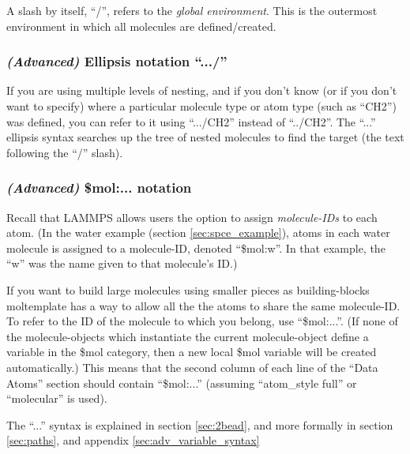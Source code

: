 \documentclass[11pt]{article}
\begin{document}
A slash by itself, ``/'', refers to the \textit{global environment}.
This is the outermost environment in which all molecules are defined/created.


\subsubsection{\textit{(Advanced)} Ellipsis notation ``.../''}
\label{sec:ellipsis_type}
If you are using multiple levels of nesting,
and if you don't know (or if you don't want to specify) where
a particular molecule type or atom type (such as ``CH2'') was defined, 
you can refer to it using ``.../CH2'' 
instead of ``../CH2''.
The ``...'' ellipsis syntax searches up the tree of nested 
molecules to find the target (the text following the ``/'' slash).

\subsubsection{\textit{(Advanced)} \$mol:... notation}
\label{sec:ellipsis_mol}
Recall that LAMMPS allows users the option to assign
\textit{molecule-IDs} to each atom.
(In the water example (section \ref{sec:spce_example}), atoms in
each water molecule is assigned to a molecule-ID, denoted ``\$mol:w''.
In that example, the ``w'' was the name given to that molecule's ID.)

If you want to build large molecules using smaller pieces as building-blocks
moltemplate has a way to allow all the the atoms to share the same molecule-ID.
To refer to the ID of the molecule to which you belong,
use ``\$mol:...''.  (If none of the molecule-objects which 
instantiate the current molecule-object define a variable in the \$mol category,
then a new local \$mol variable will be created automatically.)
This means that the second column of each line of the ``Data Atoms'' section
should contain ``\$mol:...'' 
(assuming ``atom\_style full'' or ``molecular'' is used).

The ``...'' syntax is explained in section \ref{sec:2bead},
and more formally in section \ref{sec:paths}, 
and appendix \ref{sec:adv_variable_syntax}
\end{document}
